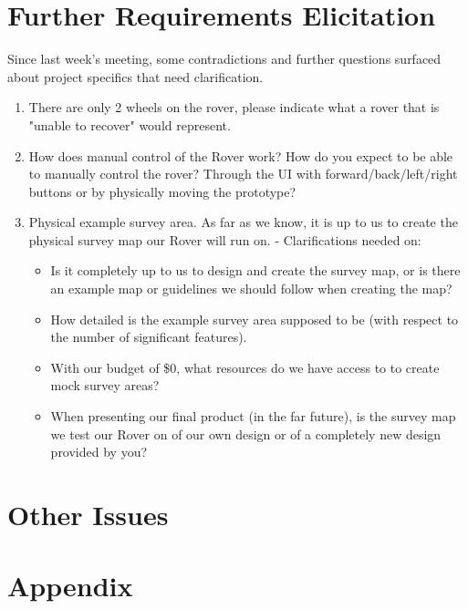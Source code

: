 \documentclass[11pt, a4paper]{article}
\begin{document}
\begin{flushleft}
  \section{Further Requirements Elicitation}
Since last week's meeting, some contradictions and further questions surfaced about project specifics that need clarification.
	\begin{enumerate}
    	\item There are only 2 wheels on the rover, please indicate what a rover that is "unable to recover" would represent.
       	\item How does manual control of the Rover work? How do you expect to be able to manually control the rover? Through the UI with forward/back/left/right buttons or by physically moving the prototype?
        \item Physical example survey area. As far as we know, it is up to us to create the physical survey map our Rover will run on. - Clarifications needed on:
        \begin{itemize}
        	\item Is it completely up to us to design and create the survey map, or is there an example map or guidelines we should follow when creating the map?
        	\item How detailed is the example survey area supposed to be (with respect to the number of significant features).
            \item With our budget of \$0, what resources do we have access to to create mock survey areas?
            \item When presenting our final product (in the far future), is the survey map we test our Rover on of our own design or of a completely new design provided by you?
        \end{itemize}
    \end{enumerate}
        
  \section{Other Issues}

\pagebreak
\section{Appendix}


\end{flushleft}
\end{document}
